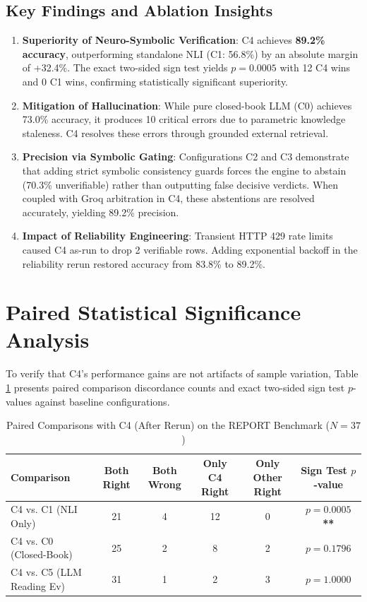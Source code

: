 \documentclass[12pt,a4paper]{report}
\begin{document}
\subsection{Key Findings and Ablation Insights}
\begin{enumerate}
    \item \textbf{Superiority of Neuro-Symbolic Verification}: C4 achieves \textbf{89.2\% accuracy}, outperforming standalone NLI (C1: 56.8\%) by an absolute margin of +32.4\%. The exact two-sided sign test yields $p = 0.0005$ with 12 C4 wins and 0 C1 wins, confirming statistically significant superiority.
    \item \textbf{Mitigation of Hallucination}: While pure closed-book LLM (C0) achieves 73.0\% accuracy, it produces 10 critical errors due to parametric knowledge staleness. C4 resolves these errors through grounded external retrieval.
    \item \textbf{Precision via Symbolic Gating}: Configurations C2 and C3 demonstrate that adding strict symbolic consistency guards forces the engine to abstain (70.3\% unverifiable) rather than outputting false decisive verdicts. When coupled with Groq arbitration in C4, these abstentions are resolved accurately, yielding 89.2\% precision.
    \item \textbf{Impact of Reliability Engineering}: Transient HTTP 429 rate limits caused C4 as-run to drop 2 verifiable rows. Adding exponential backoff in the reliability rerun restored accuracy from 83.8\% to 89.2\%.
\end{enumerate}

\section{Paired Statistical Significance Analysis}
To verify that C4's performance gains are not artifacts of sample variation, Table \ref{tab:paired_sign_test} presents paired comparison discordance counts and exact two-sided sign test $p$-values against baseline configurations.

\begin{table}[h!]
\centering
\caption{Paired Comparisons with C4 (After Rerun) on the REPORT Benchmark ($N = 37$)}
\label{tab:paired_sign_test}
\begin{tabular}{|l|c|c|c|c|c|}
\hline
\textbf{Comparison} & \textbf{Both Right} & \textbf{Both Wrong} & \textbf{Only C4 Right} & \textbf{Only Other Right} & \textbf{Sign Test $p$-value} \\
\hline
C4 vs. C1 (NLI Only) & 21 & 4 & 12 & 0 & \textbf{$p = 0.0005$**} \\
C4 vs. C0 (Closed-Book) & 25 & 2 & 8 & 2 & $p = 0.1796$ \\
C4 vs. C5 (LLM Reading Ev) & 31 & 1 & 2 & 3 & $p = 1.0000$ \\
\hline
\end{tabular}
\end{table}
\end{document}
